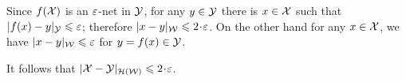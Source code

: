Since $f(\mathcal{X})$ is an $\varepsilon$-net in $\mathcal{Y}$,
for any $y\in \mathcal{Y}$ there is $x\in \mathcal{X}$ such that $|f(x)-y|_{\spc{Y}}\z\le\eps$;
therefore $|x-y|_{\spc{W}}\le 2\cdot\eps$.
On the other hand for any $x\in \mathcal{X}$, we have $|x-y|_{\mathcal{W}}\leqslant\varepsilon$
for $y=f(x)\in \mathcal{Y}$.

It follows that $|\spc{X}-\spc{Y}|_{\mathcal{H}(\spc{W})}\le 2\cdot\eps$.
\qedsf







